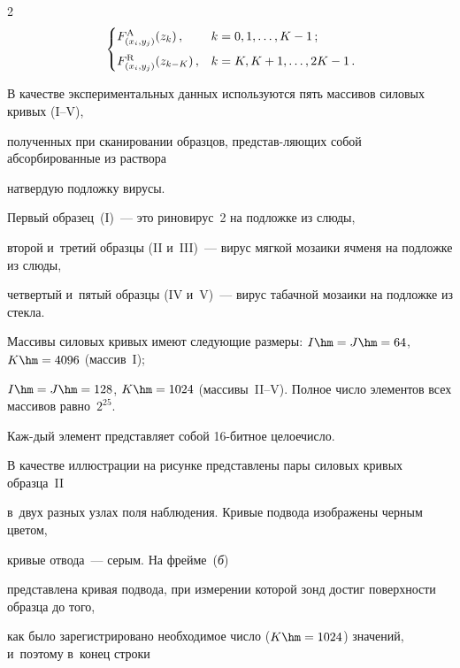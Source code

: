 \begin{multicols}{2}
\begin{multline*}
\begin{cases}
F^\text{A}_{(x_i,y_j)}(z_k)\,,        & k=0,1,\ldots,K-1\,; \\[6pt] 

F^\text{R}_{(x_i,y_j)}(z_{k-K})\,, & k=K,K+1,\ldots,2K-1\,.\hspace*{-3pt} 

\end{cases}

\end{multline*}



В качестве экспериментальных данных используются пять массивов силовых кривых (I--V), 

полученных при сканировании образцов, пред\-став-ляющих собой абсорбированные из раствора 

на\linebreak твердую подложку вирусы. 



Первый образец~(I)~--- это риновирус~2 на подложке из слюды, 

второй и~третий образцы (II и~III)~--- вирус мягкой мозаики ячменя на подложке из слюды, 

четвертый и~пятый образцы (IV и~V)~--- вирус табачной мозаики на подложке из стекла. 

Массивы силовых кривых имеют сле\-ду\-ющие размеры: $I\hm=J\hm=64$, $K\hm=4096$ (массив~I);\linebreak  

$I\hm=J\hm=128$, $K\hm=1024$ (массивы~II--V). Полное число элементов всех массивов равно~$2^{25}$. 

Каж-\linebreak дый элемент представляет собой 16-бит\-ное целое\linebreak число.

{ %



}





В качестве иллюстрации на рисунке представлены пары силовых кривых образца~II 

в~двух разных узлах поля наблюдения. Кривые подвода изображены черным цветом, 

кривые отвода~--- серым. На фрейме~(\textit{б}) 

представлена кривая подвода, при измерении которой зонд достиг поверхности образца до того, 

как было зарегистрировано необходимое число ($K\hm=1024$) значений, и~поэтому в~конец строки 


\end{multicols}
